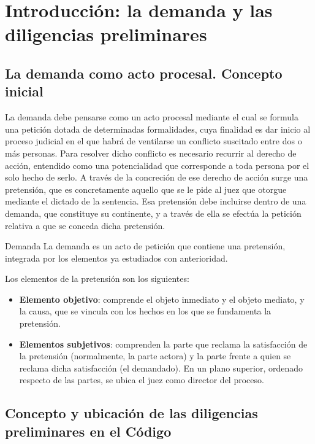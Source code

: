 \documentclass[12pt,oneside]{book}
\begin{document}
\chapter{Introducción: la demanda y las diligencias preliminares}

\section{La demanda como acto procesal. Concepto inicial}

La demanda debe pensarse como un acto procesal mediante el cual se formula una petición dotada de determinadas formalidades, cuya finalidad es dar inicio al proceso judicial en el que habrá de ventilarse un conflicto suscitado entre dos o más personas. Para resolver dicho conflicto es necesario recurrir al derecho de acción, entendido como una potencialidad que corresponde a toda persona por el solo hecho de serlo. A través de la concreción de ese derecho de acción surge una pretensión, que es concretamente aquello que se le pide al juez que otorgue mediante el dictado de la sentencia. Esa pretensión debe incluirse dentro de una demanda, que constituye su continente, y a través de ella se efectúa la petición relativa a que se conceda dicha pretensión.

\begin{definition}{Demanda}
La demanda es un acto de petición que contiene una pretensión, integrada por los elementos ya estudiados con anterioridad.
\end{definition}

Los elementos de la pretensión son los siguientes:

\begin{itemize}
    \item \textbf{Elemento objetivo}: comprende el objeto inmediato y el objeto mediato, y la causa, que se vincula con los hechos en los que se fundamenta la pretensión.
    \item \textbf{Elementos subjetivos}: comprenden la parte que reclama la satisfacción de la pretensión (normalmente, la parte actora) y la parte frente a quien se reclama dicha satisfacción (el demandado). En un plano superior, ordenado respecto de las partes, se ubica el juez como director del proceso.
\end{itemize}

\section{Concepto y ubicación de las diligencias preliminares en el Código}
\end{document}
